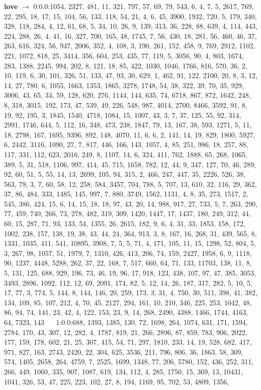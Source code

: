 \documentclass[a4paper,11pt,oneside]{book}
\begin{document}
\textbf{love} $\rightarrow$	0:0.0:1054, 2327, 481, 11, 321, 797, 57, 69, 79, 543, 6, 4, 7, 5, 2617, 769, 22, 295, 18, 17, 15, 104, 56, 133, 118, 54, 21, 4, 6, 45, 3900, 1932, 720, 5, 179, 340, 328, 118, 284, 4, 12, 61, 68, 5, 34, 10, 26, 9, 139, 313, 36, 228, 88, 639, 4, 114, 443, 224, 288, 26, 4, 41, 16, 327, 700, 165, 48, 1745, 7, 56, 430, 18, 281, 56, 460, 46, 37, 263, 616, 324, 56, 947, 2006, 352, 4, 108, 3, 190, 261, 152, 458, 9, 769, 2912, 1102, 221, 1072, 818, 25, 3414, 356, 604, 253, 435, 77, 119, 5, 3056, 90, 4, 803, 1674, 283, 1388, 2245, 994, 202, 8, 121, 18, 85, 422, 1030, 1046, 1766, 816, 570, 36, 2, 10, 119, 6, 30, 101, 326, 51, 133, 47, 93, 30, 629, 1, 462, 91, 122, 2100, 20, 8, 3, 12, 14, 27, 780, 6, 1055, 1663, 1353, 1865, 3278, 1748, 54, 38, 322, 39, 70, 35, 929, 3006, 43, 65, 34, 59, 128, 620, 276, 1144, 144, 635, 74, 6718, 867, 872, 1642, 248, 8, 318, 3015, 192, 173, 47, 539, 49, 226, 548, 987, 4014, 2700, 8466, 3592, 91, 8, 19, 92, 195, 3, 1845, 1540, 4718, 1084, 15, 1007, 43, 3, 7, 37, 125, 55, 92, 314, 2991, 1746, 644, 5, 112, 16, 348, 473, 238, 1847, 79, 13, 167, 38, 593, 1271, 5, 11, 18, 2798, 167, 1695, 9396, 892, 148, 4070, 11, 6, 6, 2, 141, 14, 19, 829, 1800, 5927, 6, 2442, 3116, 1090, 27, 7, 817, 446, 166, 143, 1057, 4, 85, 251, 986, 18, 257, 88, 117, 331, 112, 623, 2016, 249, 8, 1107, 14, 6, 324, 411, 762, 1888, 65, 268, 1065, 389, 5, 31, 518, 1106, 997, 414, 45, 715, 1658, 782, 12, 44, 9, 347, 127, 70, 46, 289, 92, 60, 51, 5, 55, 14, 13, 2699, 105, 94, 315, 2, 466, 247, 447, 35, 2226, 526, 38, 563, 79, 3, 7, 60, 58, 12, 258, 584, 3457, 704, 788, 5, 707, 13, 610, 32, 116, 29, 362, 37, 86, 484, 333, 1485, 145, 997, 7, 880, 3749, 1562, 1131, 4, 8, 35, 273, 1517, 2, 545, 386, 424, 15, 6, 14, 15, 18, 18, 97, 43, 20, 14, 988, 917, 27, 733, 5, 7, 263, 290, 77, 459, 740, 266, 73, 278, 482, 319, 309, 1420, 1447, 17, 1437, 180, 249, 312, 44, 60, 15, 287, 71, 93, 133, 54, 1355, 26, 2615, 182, 9, 6, 4, 31, 33, 1853, 158, 172, 1002, 238, 157, 138, 19, 38, 43, 44, 24, 364, 913, 3, 8, 167, 16, 268, 31, 439, 565, 8, 1331, 1035, 411, 541, 10895, 3908, 7, 5, 5, 71, 4, 171, 105, 11, 15, 1298, 52, 804, 5, 3, 267, 98, 1057, 51, 1979, 7, 1310, 426, 413, 206, 74, 159, 2427, 1958, 6, 9, 1118, 90, 1237, 4448, 5288, 262, 37, 22, 168, 7, 517, 660, 64, 71, 133, 11703, 138, 11, 8, 5, 131, 125, 688, 929, 196, 73, 46, 19, 96, 17, 918, 123, 438, 107, 97, 47, 385, 3053, 3493, 2896, 1092, 112, 12, 69, 2091, 174, 82, 5, 12, 14, 26, 187, 317, 282, 5, 10, 5, 17, 77, 3, 774, 5, 144, 8, 144, 146, 20, 259, 173, 3, 31, 4, 750, 30, 511, 398, 41, 382, 134, 109, 85, 107, 212, 4, 70, 45, 2127, 294, 161, 10, 210, 346, 225, 253, 1042, 48, 86, 94, 74, 141, 23, 42, 4, 122, 153, 23, 9, 14, 268, 2490, 4388, 1466, 1744, 4163, 64, 7323, 143	$\quad$	1:0.0:688, 1393, 1385, 130, 72, 1698, 264, 1074, 631, 171, 1594, 2784, 170, 43, 307, 12, 282, 4, 1787, 819, 21, 266, 2896, 87, 859, 783, 906, 2022, 177, 159, 178, 602, 21, 25, 307, 415, 54, 71, 297, 1810, 233, 14, 19, 528, 682, 417, 971, 827, 163, 2743, 2420, 22, 304, 625, 3536, 211, 796, 806, 36, 1863, 58, 309, 574, 1405, 2658, 264, 4759, 7, 2525, 1699, 1348, 77, 206, 5780, 152, 436, 252, 311, 266, 449, 1060, 335, 907, 1087, 619, 134, 112, 4, 285, 1750, 15, 369, 13, 10431, 1041, 326, 53, 47, 225, 223, 102, 27, 8, 194, 1169, 95, 702, 53, 4809, 1356, 
\end{document}

